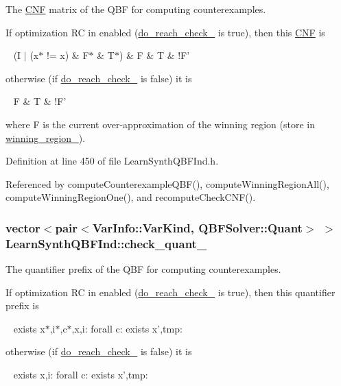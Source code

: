 The \hyperlink{classCNF}{C\-N\-F} matrix of the Q\-B\-F for computing counterexamples. 

If optimization R\-C in enabled (\hyperlink{classLearnSynthQBFInd_af87e4a2c1d17c4c5bc398082d6d3e365}{do\-\_\-reach\-\_\-check\-\_\-} is true), then this \hyperlink{classCNF}{C\-N\-F} is \par
 ~ (I $|$ (x$\ast$ != x) \& F$\ast$ \& T$\ast$) \& F \& T \& !\-F' \par
 otherwise (if \hyperlink{classLearnSynthQBFInd_af87e4a2c1d17c4c5bc398082d6d3e365}{do\-\_\-reach\-\_\-check\-\_\-} is false) it is \par
 ~ F \& T \& !\-F' \par
 where F is the current over-\/approximation of the winning region (store in \hyperlink{classLearnSynthQBFInd_ab8ce6031137413e90e0626bbdc734be0}{winning\-\_\-region\-\_\-}). 

Definition at line 450 of file Learn\-Synth\-Q\-B\-F\-Ind.\-h.



Referenced by compute\-Counterexample\-Q\-B\-F(), compute\-Winning\-Region\-All(), compute\-Winning\-Region\-One(), and recompute\-Check\-C\-N\-F().

\hypertarget{classLearnSynthQBFInd_ab9287e0b57dbf85dab6e7f7caf30cd13}{
\subsubsection[{check\-\_\-quant\-\_\-}]{\setlength{\rightskip}{0pt plus 5cm}vector$<$pair$<${\bf Var\-Info\-::\-Var\-Kind}, {\bf Q\-B\-F\-Solver\-::\-Quant}$>$ $>$ Learn\-Synth\-Q\-B\-F\-Ind\-::check\-\_\-quant\-\_\-\hspace{0.3cm}{\ttfamily [protected]}}}\label{classLearnSynthQBFInd_ab9287e0b57dbf85dab6e7f7caf30cd13}


The quantifier prefix of the Q\-B\-F for computing counterexamples. 

If optimization R\-C in enabled (\hyperlink{classLearnSynthQBFInd_af87e4a2c1d17c4c5bc398082d6d3e365}{do\-\_\-reach\-\_\-check\-\_\-} is true), then this quantifier prefix is \par
 ~ exists x$\ast$,i$\ast$,c$\ast$,x,i\-: forall c\-: exists x',tmp\-: \par
 otherwise (if \hyperlink{classLearnSynthQBFInd_af87e4a2c1d17c4c5bc398082d6d3e365}{do\-\_\-reach\-\_\-check\-\_\-} is false) it is \par
 ~ exists x,i\-: forall c\-: exists x',tmp\-: \par
 

